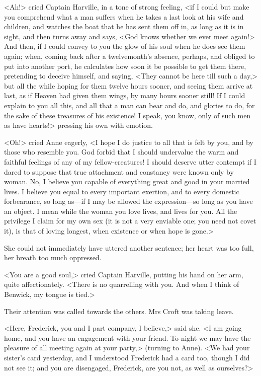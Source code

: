 <Ah!> cried Captain Harville, in a tone of strong feeling, <if I could but make you comprehend what a man suffers when he takes a last look at his wife and children, and watches the boat that he has sent them off in, as long as it is in sight, and then turns away and says, <God knows whether we ever meet again!> And then, if I could convey to you the glow of his soul when he does see them again; when, coming back after a twelvemonth's absence, perhaps, and obliged to put into another port, he calculates how soon it be possible to get them there, pretending to deceive himself, and saying, <They cannot be here till such a day,> but all the while hoping for them twelve hours sooner, and seeing them arrive at last, as if Heaven had given them wings, by many hours sooner still! If I could explain to you all this, and all that a man can bear and do, and glories to do, for the sake of these treasures of his existence! I speak, you know, only of such men as have hearts!> pressing his own with emotion.

<Oh!> cried Anne eagerly, <I hope I do justice to all that is felt by you, and by those who resemble you. God forbid that I should undervalue the warm and faithful feelings of any of my fellow-creatures! I should deserve utter contempt if I dared to suppose that true attachment and constancy were known only by woman. No, I believe you capable of everything great and good in your married lives. I believe you equal to every important exertion, and to every domestic forbearance, so long as—if I may be allowed the expression—so long as you have an object. I mean while the woman you love lives, and lives for you. All the privilege I claim for my own sex (it is not a very enviable one; you need not covet it), is that of loving longest, when existence or when hope is gone.>

She could not immediately have uttered another sentence; her heart was too full, her breath too much oppressed.

<You are a good soul,> cried Captain Harville, putting his hand on her arm, quite affectionately. <There is no quarrelling with you. And when I think of Benwick, my tongue is tied.>

Their attention was called towards the others. Mrs Croft was taking leave.

<Here, Frederick, you and I part company, I believe,> said she. <I am going home, and you have an engagement with your friend. To-night we may have the pleasure of all meeting again at your party,> (turning to Anne). <We had your sister's card yesterday, and I understood Frederick had a card too, though I did not see it; and you are disengaged, Frederick, are you not, as well as ourselves?>


